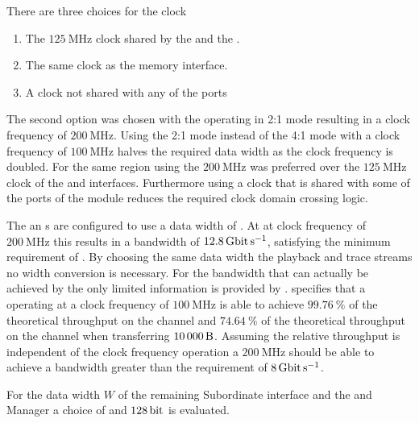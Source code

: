 There are three choices for the clock
\begin{enumerate}
    \item The $\SI{125}{\mega\hertz}$ clock shared by the \HostARQ{} and the \pbexec{}.
    \item The same clock as the \XilinxMIG{} memory interface.
    \item A clock not shared with any of the ports
\end{enumerate}
The second option was chosen with the \XilinxMIG{} operating in 2:1 mode resulting in a clock frequency of $\SI{200}{\mega\hertz}$. Using the 2:1 mode instead of the 4:1 mode with a clock frequency of $\SI{100}{\mega\hertz}$ halves the required data width as the clock frequency is doubled. For the same region using the $\SI{200}{\mega\hertz}$ was preferred over the $\SI{125}{\mega\hertz}$ clock of the \HostARQ{} and \pbexec{} interfaces.
Furthermore using a clock that is shared with some of the ports of the module reduces the required clock domain crossing logic.

The \SToMM{} an \MMToS{} \AXIStream{}s are configured to use a data width of \PhyWordSize{}. At at clock frequency of $\SI{200}{\mega\hertz}$ this results in a bandwidth of $\SI{12.8}{\giga\bit\per\second}$, satisfying the minimum requirement of \pbExecBandwidth{}. By choosing the same data width the \pbexec{} playback and trace streams no width conversion is necessary. For the bandwidth that can actually be achieved by the \AXIDMA{} only limited information is provided by \Xilinx{}. \Xilinx{} specifies that a \AXIDMA{} operating at a clock frequency of $\SI{100}{\mega\hertz}$ is able to achieve $\SI{99.76}{\percent}$ of the theoretical throughput on the \MMToS{} channel and $\SI{74.64}{\percent}$ of the theoretical throughput on the \SToMM{} channel when transferring $\SI{10000}{\byte}$\autocite{ref:axidma}. Assuming the relative throughput is independent of the clock frequency operation a $\SI{200}{\mega\hertz}$ should be able to achieve a bandwidth greater than the requirement of $\pbExecBandwidth{}$.

For the data width $W$ of the remaining \XilinxMIG{} \AXI{} Subordinate interface and the \SToMM{} and \MMToS{} \AXI{} Manager a choice of \PhyWordSize{} and $\SI{128}{\bit}$ is evaluated.

